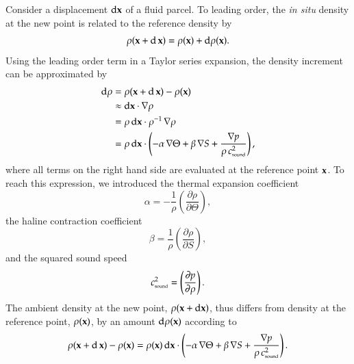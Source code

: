 Consider a displacement $\mathrm{d}{\bf x}$ of a fluid parcel.  To
leading order, the {\it in situ} density at the new point is related
to the reference density by
\begin{equation}
 \rho({\bf x} + \mathrm{d} \, {\bf x})= \rho({\bf x}) + \mathrm{d}\rho({\bf x}).
\end{equation}
Using the leading order term in a Taylor series expansion, the density
increment can be approximated by
\begin{subequations}
\begin{align}
\mathrm{d}\rho &=  \rho({\bf x} + \mathrm{d} \, {\bf x}) - \rho({\bf x})
 \\
 &\approx \mathrm{d}{\bf x} \cdot \nabla \rho
 \\
 &= \rho \, \mathrm{d}{\bf x} \cdot \rho^{-1} \, \nabla \rho
\\
&= 
\rho \, \mathrm{d}{\bf x} \cdot 
 \left( -\alpha \, \nabla \Theta + \beta \, \nabla  S  + \frac{\nabla p}{\rho \, c_{\mbox{\tiny sound}}^{2}  } \right),
\end{align}
\label{eq:full-density-increment-displacement}
\end{subequations}
where all terms on the right hand side are evaluated at the reference
point ${\bf x}$.  To reach this expression, we introduced the thermal
expansion coefficient
\begin{equation}
 \alpha = -\frac{1}{\rho}\left( \frac{\partial \rho}{\partial \Theta} \right),
\label{eq:alpha-elements}
\end{equation}
the haline contraction coefficient 
\begin{equation}
 \beta = \frac{1}{\rho}\left( \frac{\partial \rho}{\partial S} \right),
\label{eq:beta-elements}
\end{equation}
and the squared sound speed
\begin{equation}
 c^{2}_{\mbox{\tiny sound}} = \left( \frac{\partial p}{\partial \rho}\right).
\label{eq:sound-speed-elements}
\end{equation}
The ambient density at the new point, $\rho({\bf x} + \mathrm{d} {\bf
  x})$, thus differs from density at the reference point, $\rho({\bf
  x})$, by an amount $\mathrm{d}\rho({\bf x})$ according to
\begin{equation}
 \rho({\bf x} + \mathrm{d} \, {\bf x}) - \rho({\bf x}) = 
 \rho({\bf x}) \, \mathrm{d}{\bf x} \cdot 
 \left( -\alpha \, \nabla \Theta + \beta \, \nabla  S  + \frac{ \nabla p }{\rho \, c_{\mbox{\tiny sound}}^{2}  }\right).
\end{equation}


